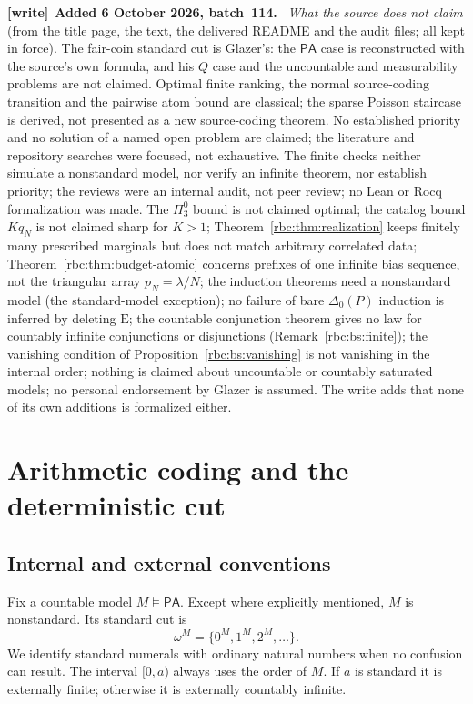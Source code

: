 \documentclass[11pt]{article}
\numberwithin{equation}{section}
\theoremstyle{definition}
\theoremstyle{remark}
\newcommand{\PA}{\mathsf{PA}}
\newcommand{\std}{\omega^M}
\newcommand{\E}{\mathrm E}
\newenvironment{writenote}[1][]{\par\smallskip\begingroup\small
 \noindent\textbf{[write]}\if\relax\detokenize{#1}\relax\else~\textbf{#1.}\fi\ }%
 {\par\endgroup\smallskip}
\begin{document}
\begin{writenote}[Added 6 October 2026, batch~114]
\emph{What the source does not claim} (from the title page, the text, the
delivered README and the audit files; all kept in force). The fair-coin
standard cut is Glazer's: the $\PA$ case is reconstructed with the source's
own formula, and his $Q$ case and the uncountable and measurability problems
are not claimed. Optimal finite ranking, the normal source-coding transition
and the pairwise atom bound are classical; the sparse Poisson staircase is
derived, not presented as a new source-coding theorem. No established
priority and no solution of a named open problem are claimed; the literature
and repository searches were focused, not exhaustive. The finite checks
neither simulate a nonstandard model, nor verify an infinite theorem, nor
establish priority; the reviews were an internal audit, not peer review; no
Lean or Rocq formalization was made. The $\Pi^0_3$ bound is not claimed
optimal; the catalog bound $Kq_N$ is not claimed sharp for $K>1$;
Theorem~\ref{rbc:thm:realization} keeps finitely many prescribed marginals
but does not match arbitrary correlated data;
Theorem~\ref{rbc:thm:budget-atomic} concerns prefixes of one infinite bias
sequence, not the triangular array $p_N=\lambda/N$; the induction theorems
need a nonstandard model (the standard-model exception); no failure of bare
$\Delta_0(P)$ induction is inferred by deleting $\E$; the countable
conjunction theorem gives no law for countably infinite conjunctions or
disjunctions (Remark~\ref{rbc:bs:finite}); the vanishing condition of
Proposition~\ref{rbc:bs:vanishing} is not vanishing in the internal order;
nothing is claimed about uncountable or countably saturated models; no
personal endorsement by Glazer is assumed. The write adds that none of its
own additions is formalized either.
\end{writenote}

\section{Arithmetic coding and the deterministic cut}
\label{rbc:sec:coding}

\subsection{Internal and external conventions}

Fix a countable model $M\models\PA$. Except where explicitly mentioned,
$M$ is nonstandard. Its standard cut is
\[
 \std=\{0^M,1^M,2^M,\ldots\}.
\]
We identify standard numerals with ordinary natural numbers when no
confusion can result. The interval $[0,a)$ always uses the order of $M$.
If $a$ is standard it is externally finite; otherwise it is externally
countably infinite.
\end{document}
